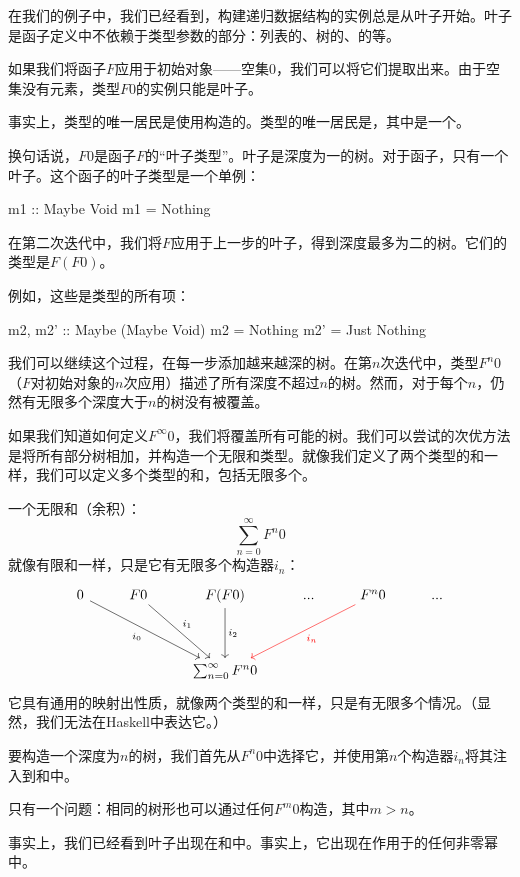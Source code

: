 \documentclass[DaoFP]{subfiles}
\begin{document}
在我们的例子中，我们已经看到，构建递归数据结构的实例总是从叶子开始。叶子是函子定义中不依赖于类型参数的部分：列表的、树的、的等。

如果我们将函子$F$应用于初始对象——空集$0$，我们可以将它们提取出来。由于空集没有元素，类型$F 0$的实例只能是叶子。

事实上，类型的唯一居民是使用构造的。类型的唯一居民是，其中是一个。

换句话说，$F 0$是函子$F$的“叶子类型”。叶子是深度为一的树。对于函子，只有一个叶子。这个函子的叶子类型是一个单例：
\begin{haskell}
m1 :: Maybe Void
m1 = Nothing
\end{haskell}

在第二次迭代中，我们将$F$应用于上一步的叶子，得到深度最多为二的树。它们的类型是$F(F 0)$。

例如，这些是类型的所有项：
\begin{haskell}
m2, m2' :: Maybe (Maybe Void)
m2 = Nothing
m2' = Just Nothing
\end{haskell}

我们可以继续这个过程，在每一步添加越来越深的树。在第$n$次迭代中，类型$F^n 0$（$F$对初始对象的$n$次应用）描述了所有深度不超过$n$的树。然而，对于每个$n$，仍然有无限多个深度大于$n$的树没有被覆盖。

如果我们知道如何定义$F^{\infty} 0$，我们将覆盖所有可能的树。我们可以尝试的次优方法是将所有部分树相加，并构造一个无限和类型。就像我们定义了两个类型的和一样，我们可以定义多个类型的和，包括无限多个。

一个无限和（余积）：
$$ \sum_{n = 0}^{\infty} F^n 0$$
就像有限和一样，只是它有无限多个构造器$i_n$：
\[
 \begin{tikzcd}
 0
 \arrow[ddrr, "i_0"']
 & F 0
  \arrow[ddr, "i_1"]
& F (F 0)
  \arrow[dd, "i_2"]
 & ...
 & F^n 0
  \arrow[ddll, red, "i_n"]
 & ...
 \\
 \\
 &&\sum_{n = 0}^{\infty} F^n 0
  \end{tikzcd}
\]
它具有通用的映射出性质，就像两个类型的和一样，只是有无限多个情况。（显然，我们无法在Haskell中表达它。）

要构造一个深度为$n$的树，我们首先从$F^n 0$中选择它，并使用第$n$个构造器$i_n$将其注入到和中。

只有一个问题：相同的树形也可以通过任何$F^m 0$构造，其中$m > n$。

事实上，我们已经看到叶子出现在和中。事实上，它出现在作用于的任何非零幂中。
\end{document}
